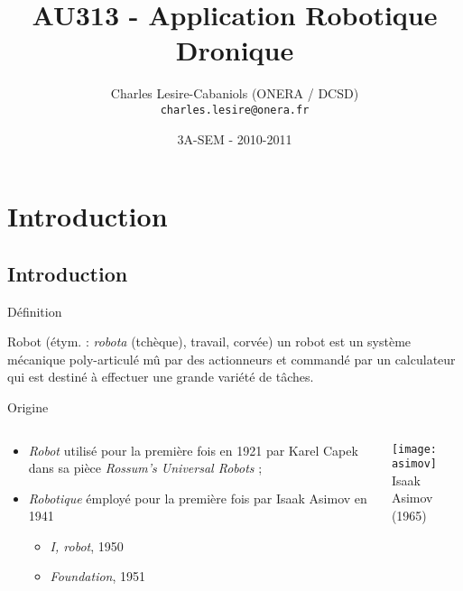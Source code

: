\documentclass[compress]{beamer}
\title[SEM AU313 - ARD]{AU313 - Application Robotique Dronique}
\author[Charles Lesire]{Charles Lesire-Cabaniols (ONERA / DCSD)\\{\tt charles.lesire@onera.fr}}
\date[2010-2011]{3A-SEM - 2010-2011}
\begin{document}
\begin{frame}
\titlepage
\end{frame}

\begin{frame}
\tableofcontents[hidesubsections]
\end{frame}

\section{Introduction}

\begin{frame}
\end{frame}

\subsection{Introduction}
\begin{frame}{Définition}
\begin{block}{Robot (étym. : {\it robota} (tchèque), travail, corvée)}
un robot est un système mécanique poly-articulé mû par des actionneurs 
et commandé par un calculateur qui est destiné à effectuer une grande variété de tâches.
\end{block}
\end{frame}

\begin{frame}{Origine}
\begin{columns}
\begin{column}{0.6\linewidth}
	\begin{itemize}
	\item {\it Robot} utilisé pour la première fois en 1921 par Karel Capek dans sa pièce {\it Rossum's Universal Robots} ;
	\item {\it Robotique} émployé pour la première fois par Isaak Asimov en 1941
		\begin{itemize}
		\item {\it I, robot}, 1950
		\item {\it Foundation}, 1951
		\end{itemize}
	\end{itemize}
\end{column}
\begin{column}{.35\linewidth}%
\begin{center}
	\texttt{[image: asimov]}\\
	\small Isaak Asimov (1965)
\end{center}
\end{column}
\end{columns}
\end{frame}
\end{document}
